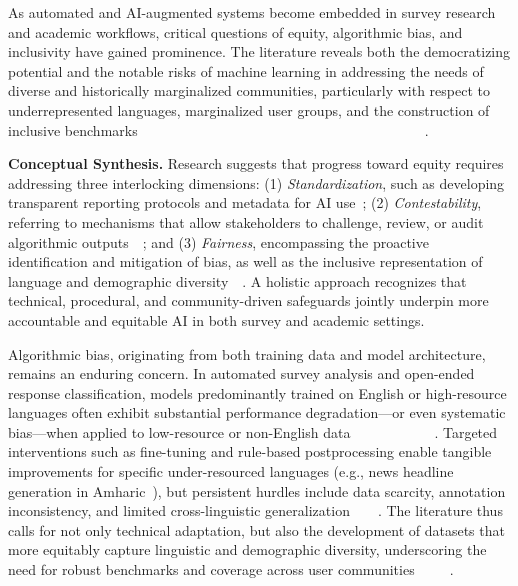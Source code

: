 \documentclass[sigconf]{acmart}
\begin{document}
As automated and AI-augmented systems become embedded in survey research and academic workflows, critical questions of equity, algorithmic bias, and inclusivity have gained prominence. The literature reveals both the democratizing potential and the notable risks of machine learning in addressing the needs of diverse and historically marginalized communities, particularly with respect to underrepresented languages, marginalized user groups, and the construction of inclusive benchmarks~\cite{ref2}~\cite{ref4}~\cite{ref7}~\cite{ref9}~\cite{ref10}~\cite{ref13}~\cite{ref14}~\cite{ref15}~\cite{ref23}~\cite{ref24}~\cite{ref39}~\cite{ref40}~\cite{ref41}~\cite{ref45}~\cite{ref51}~\cite{ref53}~\cite{ref64}~\cite{ref65}~\cite{ref66}~\cite{ref70}~\cite{ref76}~\cite{ref80}~\cite{ref81}~\cite{ref82}~\cite{ref83}~\cite{ref84}~\cite{ref85}~\cite{ref89}~\cite{ref90}~\cite{ref91}~\cite{ref92}~\cite{ref93}~\cite{ref94}~\cite{ref95}~\cite{ref96}~\cite{ref97}~\cite{ref98}~\cite{ref99}~\cite{ref100}~\cite{ref105}~\cite{ref106}. 

\textbf{Conceptual Synthesis.} Research suggests that progress toward equity requires addressing three interlocking dimensions: (1) \emph{Standardization}, such as developing transparent reporting protocols and metadata for AI use~\cite{ref106}; (2) \emph{Contestability}, referring to mechanisms that allow stakeholders to challenge, review, or audit algorithmic outputs~\cite{ref24}~\cite{ref53}; and (3) \emph{Fairness}, encompassing the proactive identification and mitigation of bias, as well as the inclusive representation of language and demographic diversity~\cite{ref10}~\cite{ref70}. A holistic approach recognizes that technical, procedural, and community-driven safeguards jointly underpin more accountable and equitable AI in both survey and academic settings.

Algorithmic bias, originating from both training data and model architecture, remains an enduring concern. In automated survey analysis and open-ended response classification, models predominantly trained on English or high-resource languages often exhibit substantial performance degradation—or even systematic bias—when applied to low-resource or non-English data~\cite{ref2}~\cite{ref9}~\cite{ref13}~\cite{ref39}~\cite{ref64}~\cite{ref65}~\cite{ref70}~\cite{ref81}~\cite{ref83}~\cite{ref95}~\cite{ref97}~\cite{ref98}. Targeted interventions such as fine-tuning and rule-based postprocessing enable tangible improvements for specific under-resourced languages (e.g., news headline generation in Amharic~\cite{ref105}), but persistent hurdles include data scarcity, annotation inconsistency, and limited cross-linguistic generalization~\cite{ref13}~\cite{ref81}~\cite{ref97}~\cite{ref98}. The literature thus calls for not only technical adaptation, but also the development of datasets that more equitably capture linguistic and demographic diversity, underscoring the need for robust benchmarks and coverage across user communities~\cite{ref39}~\cite{ref82}~\cite{ref83}~\cite{ref97}~\cite{ref98}.
\end{document}
